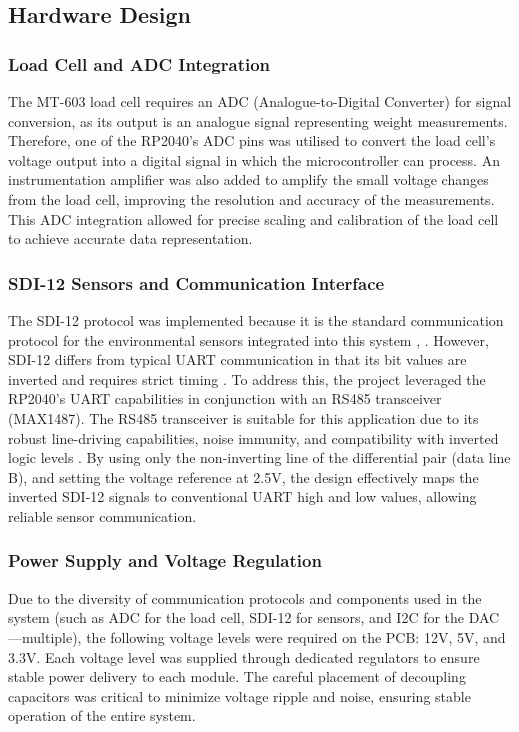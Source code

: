 \subsection{Hardware Design}

\subsubsection{Load Cell and ADC Integration}

The MT-603 load cell requires an ADC (Analogue-to-Digital Converter) for signal conversion, as its output is an analogue 
signal representing weight measurements. Therefore, one of the RP2040's ADC pins was utilised 
to convert the load cell's voltage output into a digital signal in which the microcontroller 
can process. An instrumentation amplifier was also added to amplify the small voltage changes 
from the load cell, improving the resolution and accuracy of the measurements. This ADC 
integration allowed for precise scaling and calibration of the load cell to achieve 
accurate data representation.

\subsubsection{SDI-12 Sensors and Communication Interface} 

The SDI-12 protocol was implemented because 
it is the standard communication protocol for the environmental sensors integrated into 
this system \cite{MT603}, \cite{ImplexxSapFlowSensors}. However, SDI-12 differs from typical UART communication in that its bit 
values are inverted and requires strict timing \cite{sdi12_datasheet}. To address this, the project leveraged 
the RP2040's UART capabilities in conjunction with an RS485 transceiver (MAX1487). The RS485 
transceiver is suitable for this application due to its robust line-driving capabilities, 
noise immunity, and compatibility with inverted logic levels \cite{AnalogDevicesMAX1487}. By using only the non-inverting 
line of the differential pair (data line B), and setting the voltage reference at 2.5V, the design 
effectively maps the inverted SDI-12 signals to conventional UART high and low values, 
allowing reliable sensor communication.

\subsubsection{Power Supply and Voltage Regulation}

Due to the diversity of communication protocols 
and components used in the system (such as ADC for the load cell, SDI-12 for sensors, and I2C 
for the DAC—multiple), the following voltage levels were required on the PCB: 12V, 5V, and 3.3V. Each voltage 
level was supplied through dedicated regulators to ensure stable power delivery to each module. 
The careful placement of decoupling capacitors was critical to minimize voltage ripple and noise, 
ensuring stable operation of the entire system.

